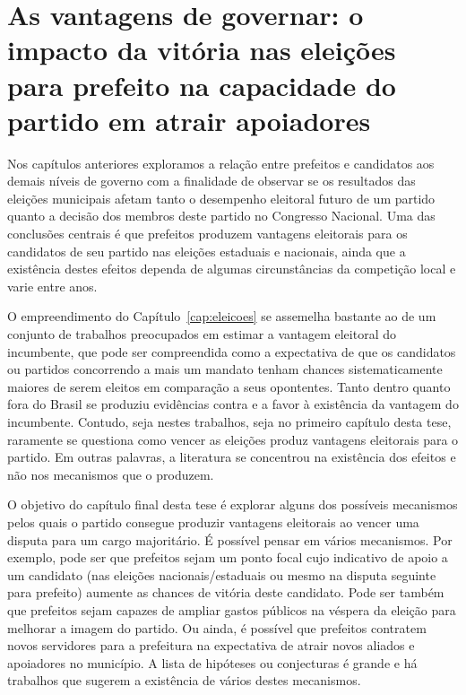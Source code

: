 \chapter{As vantagens de governar: o impacto da vitória nas eleições para prefeito na capacidade do partido em atrair apoiadores}
\label{cap:mecanismos}

Nos capítulos anteriores exploramos a relação entre prefeitos e candidatos aos demais níveis de governo com a finalidade de observar se os resultados das eleições municipais afetam tanto o desempenho eleitoral futuro de um partido quanto a decisão dos membros deste partido no Congresso Nacional. Uma das conclusões centrais é que prefeitos produzem vantagens eleitorais para os candidatos de seu partido nas eleições estaduais e nacionais, ainda que a existência destes efeitos dependa de algumas circunstâncias da competição local e varie entre anos.

O empreendimento do Capítulo~\ref{cap:eleicoes} se assemelha bastante ao de um conjunto de trabalhos preocupados em estimar a vantagem eleitoral do incumbente, que pode ser compreendida como a expectativa de que os candidatos ou partidos concorrendo a mais um mandato tenham chances sistematicamente maiores de serem eleitos em comparação a seus opontentes. Tanto dentro quanto fora do Brasil se produziu evidências contra e a favor à existência da vantagem do incumbente. Contudo, seja nestes trabalhos, seja no primeiro capítulo desta tese, raramente se questiona como vencer as eleições produz vantagens eleitorais para o partido. Em outras palavras, a literatura se concentrou na existência dos efeitos e não nos mecanismos que o produzem.

O objetivo do capítulo final desta tese é explorar alguns dos possíveis mecanismos pelos quais o partido consegue produzir vantagens eleitorais ao vencer uma disputa para um cargo majoritário. É possível pensar em vários mecanismos. Por exemplo, pode ser que prefeitos sejam um ponto focal cujo indicativo de apoio a um candidato (nas eleições nacionais/estaduais ou mesmo na disputa seguinte para prefeito) aumente as chances de vitória deste candidato. Pode ser também que prefeitos sejam capazes de ampliar gastos públicos na véspera da eleição para melhorar a imagem do partido. Ou ainda, é possível que prefeitos contratem novos servidores para a prefeitura na expectativa de atrair novos aliados e apoiadores no município. A lista de hipóteses ou conjecturas é grande e há trabalhos que sugerem a existência de vários destes mecanismos.

